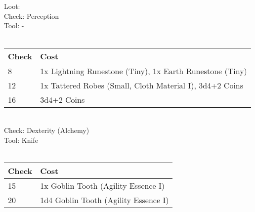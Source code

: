 Loot:\\
Check: Perception\\
Tool: -\\
\\
\begin{minipage}{0.8\textwidth}
	\begin{tabular}{|l | l|}
		\hline
		Check & Cost\\
		\hline
		8 & 1x Lightning Runestone (Tiny), 1x Earth Runestone (Tiny)\\
		12 & 1x Tattered Robes (Small, Cloth Material I), 3d4+2 Coins\\
		16 & 3d4+2 Coins\\
		\hline
	\end{tabular}
\end{minipage}
\\
Check: Dexterity (Alchemy)\\
Tool: Knife\\
\\
\begin{minipage}{0.8\textwidth}
	\begin{tabular}{|l | l|}
		\hline
		Check & Cost\\
		\hline
		15 & 1x Goblin Tooth (Agility Essence I)\\
		20 & 1d4 Goblin Tooth (Agility Essence I)\\
		\hline
	\end{tabular}
\end{minipage}
\pagebreak